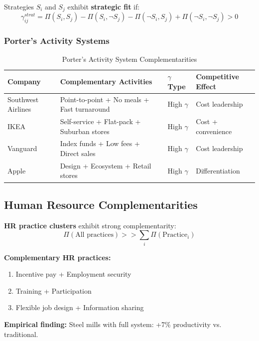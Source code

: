 \begin{definition}
Strategies $S_i$ and $S_j$ exhibit \textbf{strategic fit} if:
\begin{equation}
\gamma^{strat}_{ij} = \Pi(S_i, S_j) - \Pi(S_i, \neg S_j) - \Pi(\neg S_i, S_j) + \Pi(\neg S_i, \neg S_j) > 0
\end{equation}
\end{definition}

\subsubsection{Porter's Activity Systems}

\begin{table}[h]
\centering
\caption{Porter's Activity System Complementarities}
\label{tab:porter-gamma}
\renewcommand{\arraystretch}{1.2}
\small
\begin{tabular}{@{}p{2.5cm}p{4cm}p{2cm}p{3cm}@{}}
\toprule
\textbf{Company} & \textbf{Complementary Activities} & \textbf{$\gamma$ Type} & \textbf{Competitive Effect} \\
\midrule
Southwest Airlines & Point-to-point + No meals + Fast turnaround & High $\gamma$ & Cost leadership \\
IKEA & Self-service + Flat-pack + Suburban stores & High $\gamma$ & Cost + convenience \\
Vanguard & Index funds + Low fees + Direct sales & High $\gamma$ & Cost leadership \\
Apple & Design + Ecosystem + Retail stores & High $\gamma$ & Differentiation \\
\bottomrule
\end{tabular}
\end{table}

\subsection{Human Resource Complementarities}

\begin{theorem}[Ichniowski et al., 1997]
\textbf{HR practice clusters} exhibit strong complementarity:
\begin{equation}
\Pi(\text{All practices}) >> \sum_i \Pi(\text{Practice}_i)
\end{equation}

\textbf{Complementary HR practices:}
\begin{enumerate}[noitemsep]
    \item Incentive pay + Employment security
    \item Training + Participation
    \item Flexible job design + Information sharing
\end{enumerate}

\textbf{Empirical finding:} Steel mills with full system: +7\% productivity vs. traditional.
\end{theorem}

